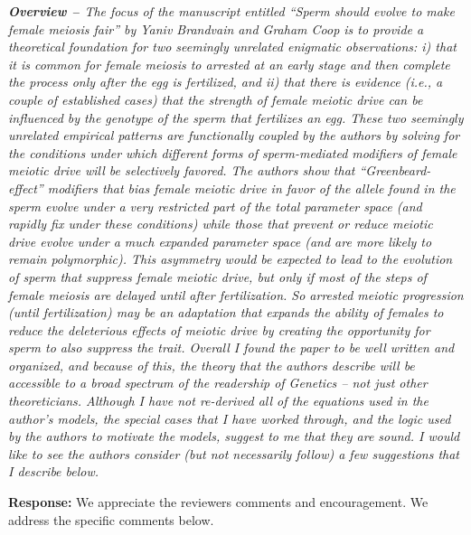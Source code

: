 \documentclass[12pt,letterpaper]{article}
\begin{document}
\emph{{\bf{Overview -- }} 
The focus of the manuscript entitled  ``Sperm should evolve to make female meiosis
fair'' by Yaniv Brandvain and Graham Coop is to provide a theoretical foundation
for two seemingly unrelated enigmatic observations: i) that it is common for
female meiosis to arrested at an early stage and then complete the process only
after the egg is fertilized, and ii) that there is evidence (i.e., a couple of
established cases) that the strength of female meiotic drive can be influenced
by the genotype of the sperm that fertilizes an egg.  These two seemingly
unrelated empirical patterns are functionally coupled by the authors by solving
for the conditions under which different forms of sperm-mediated modifiers of
female meiotic drive will be selectively favored.  The authors show that
``Greenbeard-effect'' modifiers that bias female meiotic drive in favor of the
allele found in the sperm evolve under a very restricted part of the total
parameter space (and rapidly fix under these conditions) while those that
prevent or reduce meiotic drive evolve under a much expanded parameter space
(and are more likely to remain polymorphic).  This asymmetry would be expected
to lead to the evolution of sperm that suppress female meiotic drive, but only
if most of the steps of female meiosis are delayed until after fertilization. So
arrested meiotic progression (until fertilization) may be an adaptation that
expands the ability of females to reduce the deleterious effects of meiotic
drive by creating the opportunity for sperm to also suppress the trait. 
	 Overall I found the paper to be well written and organized, and because of
this, the theory that the authors describe will be accessible to a broad
spectrum of the readership of Genetics -- not just other theoreticians.  Although
I have not re-derived all of the equations used in the author's models, the
special cases that I have worked through, and the logic used by the authors to
motivate the models, suggest to me that they are sound. I would like to see the
authors consider (but not necessarily follow) a few suggestions that I describe
below.  
}


{\bf{Response:}} We appreciate the reviewers comments and encouragement. We address the specific comments below.
\end{document}
